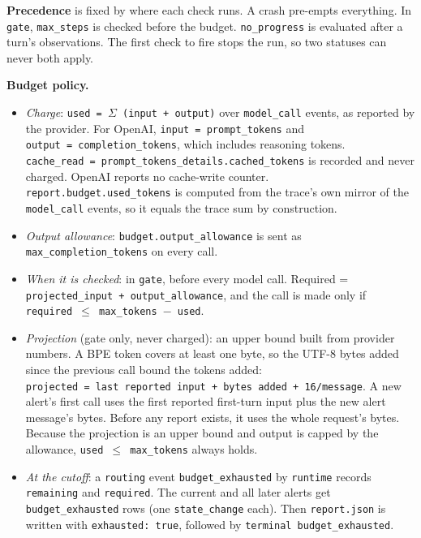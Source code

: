 \documentclass[
  10pt,
]{article}
\providecommand{\tightlist}{%
  \setlength{\itemsep}{0pt}\setlength{\parskip}{0pt}}
\begin{document}
\textbf{Precedence} is fixed by where each check runs. A crash pre-empts
everything. In \texttt{gate}, \texttt{max\_steps} is checked before the
budget. \texttt{no\_progress} is evaluated after a turn's observations.
The first check to fire stops the run, so two statuses can never both
apply.

\textbf{Budget policy.}

\begin{itemize}
\tightlist
\item
  \emph{Charge}: \texttt{used\ =\ \ensuremath{\Sigma}\ (input\ +\ output)} over
  \texttt{model\_call} events, as reported by the provider. For OpenAI,
  \texttt{input\ =\ prompt\_tokens} and
  \texttt{output\ =\ completion\_tokens}, which includes reasoning
  tokens.
  \texttt{cache\_read\ =\ prompt\_tokens\_details.cached\_tokens} is
  recorded and never charged. OpenAI reports no cache-write counter.
  \texttt{report.budget.used\_tokens} is computed from the trace's own
  mirror of the \texttt{model\_call} events, so it equals the trace sum
  by construction.
\item
  \emph{Output allowance}: \texttt{budget.output\_allowance} is sent as
  \texttt{max\_completion\_tokens} on every call.
\item
  \emph{When it is checked}: in \texttt{gate}, before every model call.
  Required = \texttt{projected\_input\ +\ output\_allowance}, and the
  call is made only if \texttt{required\ \ensuremath{\leq}\ max\_tokens\ \ensuremath{-}\ used}.
\item
  \emph{Projection} (gate only, never charged): an upper bound built
  from provider numbers. A BPE token covers at least one byte, so the
  UTF-8 bytes added since the previous call bound the tokens added:
  \texttt{projected\ =\ last\ reported\ input\ +\ bytes\ added\ +\ 16/message}.
  A new alert's first call uses the first reported first-turn input plus
  the new alert message's bytes. Before any report exists, it uses the
  whole request's bytes. Because the projection is an upper bound and
  output is capped by the allowance, \texttt{used\ \ensuremath{\leq}\ max\_tokens}
  always holds.
\item
  \emph{At the cutoff}: a \texttt{routing} event
  \texttt{budget\_exhausted} by \texttt{runtime} records
  \texttt{remaining} and \texttt{required}. The current and all later
  alerts get \texttt{budget\_exhausted} rows (one \texttt{state\_change}
  each). Then \texttt{report.json} is written with
  \texttt{exhausted:\ true}, followed by
  \texttt{terminal\ budget\_exhausted}.
\end{itemize}
\end{document}
